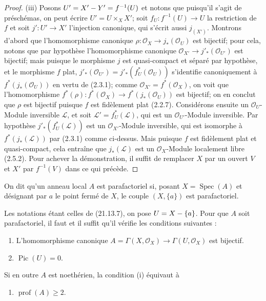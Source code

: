 \begin{proof}
(iii) Posons $U'=X'- Y'=f^{-1}(U)$ et notons que puisqu'il s'agit de préschémas, on
peut écrire $U'=U\times_X X'$; soit $f_U:f^{-1}(U)\to U$ la restriction de $f$ et
soit $j':U'\to X'$ l'injection canonique, qui s'écrit aussi $j_{(X')}$. Montrons
d'abord que l'homomorphisme canonique
$\rho:\mathcal O_X\to j_*(\mathcal O_U)$ est bijectif; pour cela, notons que par
hypothèse l'homomorphisme canonique
$\mathcal O_{X'}\to j'_*(\mathcal O_{U'})$ est bijectif; mais puisque le morphisme
$j$ est quasi-compact et séparé par hypothèse, et le morphisme $f$ plat,
$j'_*(\mathcal O_{U'})=j'_*(f_U^*(\mathcal O_U))$ s'identifie canoniquement à
$f^*(j_*(\mathcal O_U))$ en vertu de (2.3.1); comme
$\mathcal O_{X'}=f^*(\mathcal O_X)$, on voit que l'homomorphisme
$f^*(\rho):f^*(\mathcal O_X)\to f^*(j_*(\mathcal O_U))$ est bijectif; on en conclut
que $\rho$ est bijectif puisque $f$ est fidèlement plat (2.2.7). Considérons ensuite
un $\mathcal O_U$-Module inversible $\mathscr L$, et soit
$\mathscr L'=f_U^*(\mathscr L)$, qui est un $\mathcal O_{U'}$-Module inversible. Par
hypothèse $j'_*(f_U^*(\mathscr L))$ est un $\mathcal O_{X'}$-Module inversible, qui
est isomorphe à $f^*(j_*(\mathscr L))$ par (2.3.1) comme ci-dessus. Mais puisque $f$
est fidèlement plat et quasi-compact, cela entraîne que $j_*(\mathscr L)$ est un
$\mathcal O_X$-Module localement libre (2.5.2). Pour achever la démonstration, il
suffit de remplacer $X$ par un ouvert $V$ et $X'$ par $f^{-1}(V)$ dans ce qui
précède.
\end{proof}

\begin{definition}[21.13.7]
On dit qu'un anneau local $A$ est parafactoriel si, posant
$X=\operatorname{Spec}(A)$ et désignant par $a$ le point fermé de $X$, le couple
$(X,\{a\})$ est parafactoriel.
\end{definition}

\begin{proposition}[21.13.8]
\label{IV.21.13.8}
Les notations étant celles de \textup{(21.13.7)}, on pose $U=X-\{a\}$. Pour que $A$ soit
parafactoriel, il faut et il suffit qu'il vérifie les conditions suivantes :
\begin{enumerate}[label=\textup{(\roman*)}]
  \item L'homomorphisme canonique
  $A=\Gamma(X,\mathcal O_X)\to\Gamma(U,\mathcal O_X)$ est bijectif.
  \item $\operatorname{Pic}(U)=0$.
\end{enumerate}

Si en outre $A$ est noethérien, la condition \textup{(i)} équivaut à
\begin{enumerate}
  \item[\textup{(i \emph{bis})}] $\operatorname{prof}(A)\geq2$.
\end{enumerate}
\end{proposition}

